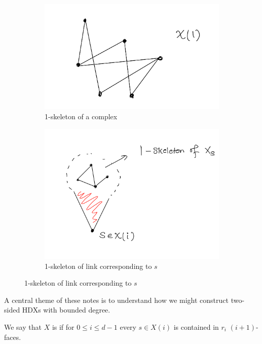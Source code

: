 \begin{figure}
    \centering 
    \begin{subfigure}{.5\textwidth}
        \centering
        \includegraphics[scale=.1]{fig/dim-1.jpeg}
        \caption{1-skeleton of a complex}
    \end{subfigure}%
    \begin{subfigure}{.5\textwidth}
        \centering
        \includegraphics[scale=.15]{fig/1-skel.jpeg}
        \caption{1-skeleton of link corresponding to \(s\)}
    \end{subfigure}
\end{figure}

A central theme of these notes is to understand how we might construct two-sided HDXs with bounded degree. 

\begin{definition}
    We say that \(X\) is 
     if for \(0\leqslant i \leqslant d-1\)
    every \(s \in X(i)\) is contained in \(r_i\) \((i+1)\)-faces.        
\end{definition}

